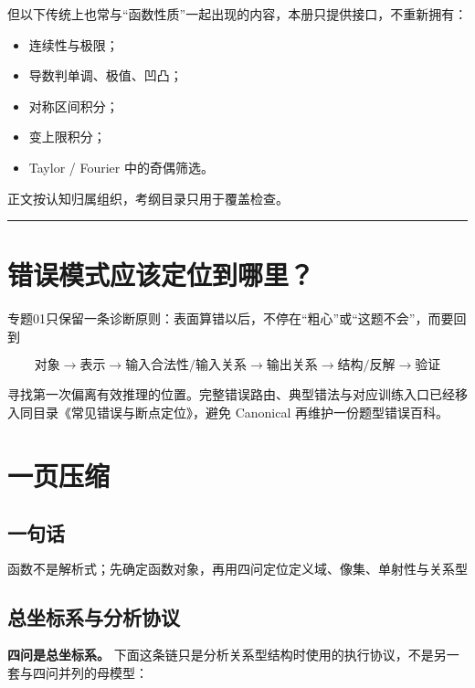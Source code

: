 \documentclass[11pt,a4paper]{ctexart}
\providecommand{\tightlist}{}
\begin{document}
但以下传统上也常与``函数性质''一起出现的内容，本册只提供接口，不重新拥有：

\begin{itemize}
\tightlist
\item
  连续性与极限；
\item
  导数判单调、极值、凹凸；
\item
  对称区间积分；
\item
  变上限积分；
\item
  Taylor / Fourier 中的奇偶筛选。
\end{itemize}

正文按认知归属组织，考纲目录只用于覆盖检查。

\begin{center}\rule{0.5\linewidth}{0.5pt}\end{center}

\section{错误模式应该定位到哪里？}\label{ux9ad8ux9891ux9519ux8befux5e94ux8be5ux5b9aux4f4dux5230ux54eaux91cc}

专题01只保留一条诊断原则：表面算错以后，不停在“粗心”或“这题不会”，而要回到

\[
\boxed{
\text{对象}\to\text{表示}\to\text{输入合法性/输入关系}\to\text{输出关系}\to\text{结构/反解}\to\text{验证}
}
\]

寻找第一次偏离有效推理的位置。完整错误路由、典型错法与对应训练入口已经移入同目录《常见错误与断点定位》，避免 Canonical 再维护一份题型错误百科。


\section{一页压缩}\label{ux4e00ux9875ux538bux7f29}

\subsection{一句话}\label{ux4e00ux53e5ux8bdd}

\[
\boxed{
\text{函数不是解析式；先确定函数对象，再用四问定位定义域、像集、单射性与关系型结构。}
}
\]

\subsection{总坐标系与分析协议}\label{ux4e00ux5f20ux6bcdux56fe}

\textbf{四问是总坐标系。} 下面这条链只是分析关系型结构时使用的执行协议，不是另一套与四问并列的母模型：
\end{document}
